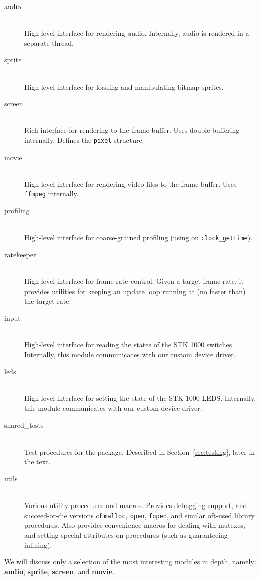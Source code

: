 \documentclass[a4paper,10pt]{article}
\newcommand{\isrc}[1]{\texttt{#1}}
\begin{document}
\begin{description}
    \item[audio] \hfill \\
        High-level interface for rendering audio.  Internally, audio is
        rendered in a separate thread.

    \item[sprite] \hfill \\
        High-level interface for loading and manipulating bitmap sprites.

    \item[screen] \hfill \\
        Rich interface for rendering to the frame buffer. Uses double buffering
        internally. Defines the \isrc{pixel} structure.

    \item[movie] \hfill \\
        High-level interface for rendering video files to the frame buffer.
        Uses \texttt{ffmpeg} internally.

    \item[profiling] \hfill \\
        High-level interface for coarse-grained profiling (using on
        \isrc{clock\_gettime}).

    \item[ratekeeper] \hfill \\
        High-level interface for frame-rate control. Given a target frame
        rate, it provides utilities for keeping an update loop running at (no
        faster than) the target rate.

    \item[input] \hfill \\
        High-level interface for reading the states of the 
        STK 1000 switches. Internally,
        this module communicates with our custom device driver.

    \item[leds] \hfill \\
        High-level interface for setting the state of the STK 1000 LEDS.
        Internally, this module communicates with our custom device driver.

    \item[shared\_tests] \hfill \\
        Test procedures for the package. Described in
        Section~\ref{sec:testing}, later in the text.

    \item[utils] \hfill \\
        Various utility procedures and macros. Provides debugging support, and
        succeed-or-die versions of \isrc{malloc}, \isrc{open}, \isrc{fopen},
        and similar oft-used library procedures. Also provides convenience
        macros for dealing with mutexes, and setting special attributes on
        procedures (such as guaranteeing inlining).
\end{description}
We will discuss only a selection of the most interesting modules in depth,
namely: \textbf{audio}, \textbf{sprite}, \textbf{screen}, and \textbf{movie}.
\end{document}
